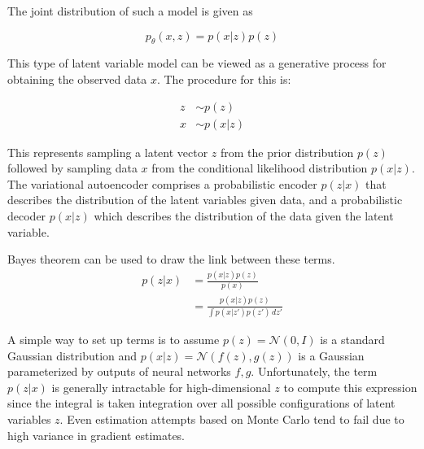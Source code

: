 The joint distribution of such a model is given as

$$
  p_{\theta}(x,z) = p(x|z)p(z)
$$



This type of latent variable model can be viewed as a generative process for obtaining the observed data $x$. The procedure for this is:


$$
\begin{aligned}
  z &\sim p(z) \\
  x &\sim p(x|z)
\end{aligned}
$$

This represents sampling a latent vector $z$ from the prior distribution $p(z)$ followed by sampling data $x$ from the conditional likelihood distribution $p(x|z)$. The variational autoencoder comprises a probabilistic encoder $p(z|x)$ that describes the distribution of the latent variables given data, and a probabilistic decoder $p(x|z)$ which describes the distribution of the data given the latent variable. 


Bayes theorem can be used to draw the link between these terms. 
$$
\begin{aligned}
  p(z|x) 
  &= \frac{p(x|z)p(z)}{p(x)} \\
  &= \frac{p(x|z)p(z)}{\int p(x|z')p(z') \,dz'}
\end{aligned}
$$

A simple way to set up terms is to assume $p(z) = \mathcal{N}(0, I)$ is a standard Gaussian distribution and $p(x|z) = \mathcal{N}(f(z),g(z))$ is a Gaussian parameterized by outputs of neural networks $f, g$. Unfortunately, the term $p(z|x)$ is generally intractable for high-dimensional $z$ to compute this expression since the integral is taken integration over all possible configurations of latent variables $z$. Even estimation attempts based on Monte Carlo tend to fail due to high variance in gradient estimates. %


